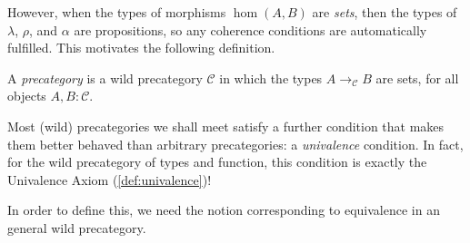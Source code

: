 However, when the types of morphisms $\hom(A,B)$ are \emph{sets}, then the types
of $\lambda$, $\rho$, and $\alpha$ are propositions, so any coherence conditions
are automatically fulfilled.
This motivates the following definition.

\begin{definition}\label{def:precategory}
  A \emph{precategory}
  is a wild precategory $\mathcal C$ in which the types
  $A \to_{\mathcal C} B$ are sets, for all objects $A,B : \mathcal C$.
\end{definition}

Most (wild) precategories we shall meet satisfy a further condition
that makes them better behaved than arbitrary precategories:
a \emph{univalence} condition.
In fact, for the wild precategory of types and function,
this condition is exactly the Univalence Axiom (\cref{def:univalence})!

In order to define this, we need the notion corresponding to equivalence
in an general wild precategory.


